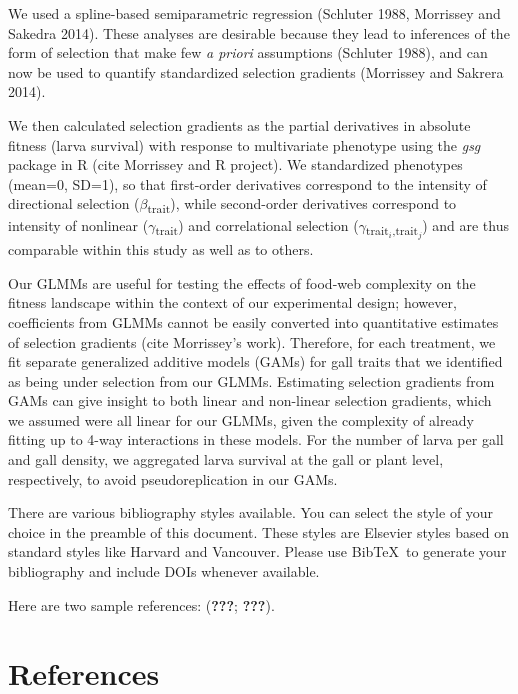 \documentclass[]{elsarticle} %
\begin{document}
We used a spline-based semiparametric regression (Schluter 1988,
Morrissey and Sakedra 2014). These analyses are desirable because they
lead to inferences of the form of selection that make few
\textit{a priori} assumptions (Schluter 1988), and can now be used to
quantify standardized selection gradients (Morrissey and Sakrera 2014).

We then calculated selection gradients as the partial derivatives in
absolute fitness (larva survival) with response to multivariate
phenotype using the \textit{gsg} package in R (cite Morrissey and R
project). We standardized phenotypes (mean=0, SD=1), so that first-order
derivatives correspond to the intensity of directional selection
(\(\beta\)\textsubscript{trait}), while second-order derivatives
correspond to intensity of nonlinear (\(\gamma\)\textsubscript{trait})
and correlational selection
(\(\gamma\)\textsubscript{trait$_i$,}\textsubscript{trait$_j$}) and are
thus comparable within this study as well as to others.

Our GLMMs are useful for testing the effects of food-web complexity on
the fitness landscape within the context of our experimental design;
however, coefficients from GLMMs cannot be easily converted into
quantitative estimates of selection gradients (cite Morrissey's work).
Therefore, for each treatment, we fit separate generalized additive
models (GAMs) for gall traits that we identified as being under
selection from our GLMMs. Estimating selection gradients from GAMs can
give insight to both linear and non-linear selection gradients, which we
assumed were all linear for our GLMMs, given the complexity of already
fitting up to 4-way interactions in these models. For the number of
larva per gall and gall density, we aggregated larva survival at the
gall or plant level, respectively, to avoid pseudoreplication in our
GAMs.

There are various bibliography styles available. You can select the
style of your choice in the preamble of this document. These styles are
Elsevier styles based on standard styles like Harvard and Vancouver.
Please use BibTeX~to generate your bibliography and include DOIs
whenever available.

Here are two sample references: ({\textbf{???}}; {\textbf{???}}).

\section*{References}\label{references}
\end{document}
